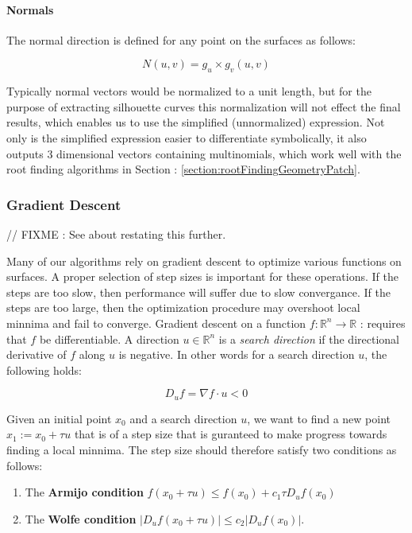 \documentclass[12pt, letterpaper]{article}
\begin{document}
		\paragraph{Normals}

		The normal direction is defined for any point on the surfaces as follows:

		$$N(u,v) = g_{u} \times g_{v} (u, v)$$

		Typically normal vectors would be normalized to a unit length, but for the purpose of extracting silhouette curves
		this normalization will not effect the final results, which enables us to use the simplified (unnormalized) expression.
		Not only is the simplified expression easier to differentiate symbolically, it also outputs 3 dimensional vectors containing multinomials,
		which work well with the root finding algorithms in Section : \ref{section:rootFindingGeometryPatch}.
		
		\subsubsection{Gradient Descent}
		\label{section:GD}

		// FIXME : See about restating this further.
		
		Many of our algorithms rely on gradient descent to optimize various functions on surfaces. A proper selection of step sizes is important for these
		operations. If the steps are too slow, then performance will suffer due to slow convergance. If the steps are too large, then the optimization procedure may overshoot local minnima and fail to converge.
		Gradient descent on a function $f : \mathbb{R}^{n} \rightarrow \mathbb{R}$ :  requires that $f$ be differentiable. A direction $u \in \mathbb{R}^{n}$ 
		is a \emph{search direction} if the directional derivative of $f$ along $u$ is negative. In other words for a search direction $u$, the following holds:

		$$ D_{u}f = \nabla f \cdot u < 0$$

		Given an initial point $x_{0}$ and a search direction $u$, we want to find a new point $x_{1} := x_{0} + \tau u$ that is of a step size that is guranteed to make progress towards finding a local minnima. 
		The step size should therefore satisfy two conditions as follows:

		\begin{enumerate}
		\item The \textbf{Armijo condition} $f(x_{0} + \tau u) \le f(x_{0}) + c_{1} \tau D_{u} f(x_{0})$\\
		\item The \textbf{Wolfe condition} $|D_{u}f(x_{0} + \tau u)| \le c_{2}|D_{u}f(x_{0})|.$
		\end{enumerate}
\end{document}
